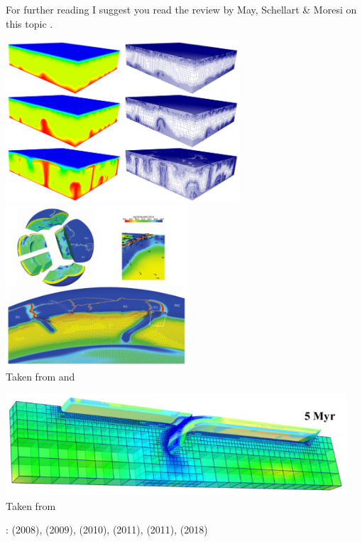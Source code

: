For further reading I suggest you read the review by May, Schellart \& Moresi on this topic \cite{masm13}.

\begin{center}
\includegraphics[height=6cm]{images/meshes/bugg08.jpg}
\includegraphics[height=6cm]{images/meshes/bugg10.jpg}\\
{\captionfont Taken from \cite{bugg08} and \cite{bugg10}}
\end{center}

\begin{center}
\includegraphics[height=3.8cm]{images/meshes/gltf18.jpg}\\
{\captionfont Taken from \cite{gltf18}}
\end{center}

\Literature: 
\textcite{bugg08} (2008),
\textcite{bugs09} (2009), 
\textcite{bugg10} (2010),
\textcite{lezh11} (2011),
\textcite{mish11} (2011),
\textcite{svna18} (2018)


\newpage
